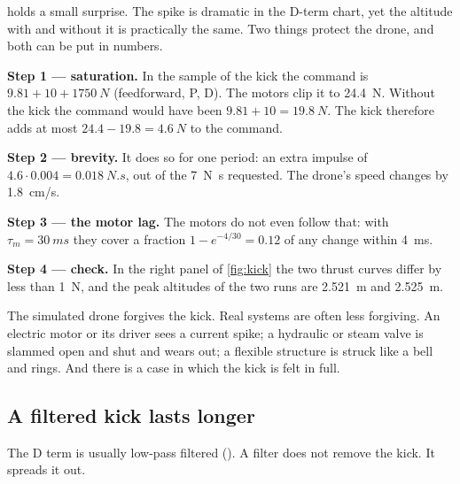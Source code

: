  holds a small surprise. The spike is dramatic in the D-term chart, yet the altitude with and without it is practically the same. Two things protect the drone, and both can be put in numbers.

\begin{example}
\label{ex:kick-impulse}
\textbf{Step 1 — saturation.} In the sample of the kick the command is $9.81 + 10 + 1750\ \si{N}$ (feedforward, P, D). The motors clip it to \SI{24.4}{N}. Without the kick the command would have been $9.81 + 10 = \SI{19.8}{N}$. The kick therefore adds at most $24.4 - 19.8 = \SI{4.6}{N}$ to the command.

\textbf{Step 2 — brevity.} It does so for one period: an extra impulse of $4.6 \cdot 0.004 = \SI{0.018}{N.s}$, out of the \SI{7}{N.s} requested. The drone's speed changes by \SI{1.8}{cm/s}.

\textbf{Step 3 — the motor lag.} The motors do not even follow that: with $\tau_m = \SI{30}{ms}$ they cover a fraction $1 - e^{-4/30} = 0.12$ of any change within \SI{4}{ms}.

\textbf{Step 4 — check.} In the right panel of \cref{fig:kick} the two thrust curves differ by less than \SI{1}{N}, and the peak altitudes of the two runs are \SI{2.521}{m} and \SI{2.525}{m}.
\end{example}

The simulated drone forgives the kick. Real systems are often less forgiving. An electric motor or its driver sees a current spike; a hydraulic or steam valve is slammed open and shut and wears out; a flexible structure is struck like a bell and rings. And there is a case in which the kick is felt in full.

\subsection{A filtered kick lasts longer}
The D term is usually low-pass filtered (). A filter does not remove the kick. It spreads it out.

